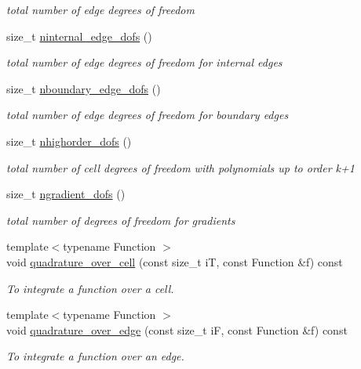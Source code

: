 \begin{DoxyCompactItemize}
\begin{DoxyCompactList}\small\item\em total number of edge degrees of freedom \end{DoxyCompactList}\item 
size\+\_\+t \hyperlink{group__HybridCore_gae6e771ab58f248db8f051d47de982cf5}{ninternal\+\_\+edge\+\_\+dofs} ()
\begin{DoxyCompactList}\small\item\em total number of edge degrees of freedom for internal edges \end{DoxyCompactList}\item 
size\+\_\+t \hyperlink{group__HybridCore_ga5fd63afc45211d3005f6e25682c533b2}{nboundary\+\_\+edge\+\_\+dofs} ()
\begin{DoxyCompactList}\small\item\em total number of edge degrees of freedom for boundary edges \end{DoxyCompactList}\item 
size\+\_\+t \hyperlink{group__HybridCore_gaa7f78bc066429a18ad596d45a79d37bc}{nhighorder\+\_\+dofs} ()
\begin{DoxyCompactList}\small\item\em total number of cell degrees of freedom with polynomials up to order k+1 \end{DoxyCompactList}\item 
size\+\_\+t \hyperlink{group__HybridCore_ga6f7c5ef5103bed8a3e0ecc18d592b1f9}{ngradient\+\_\+dofs} ()
\begin{DoxyCompactList}\small\item\em total number of degrees of freedom for gradients \end{DoxyCompactList}\item 
{\footnotesize template$<$typename Function $>$ }\\void \hyperlink{group__HybridCore_ga3c33c8cec55dbe2d8873e53fcd43d01f}{quadrature\+\_\+over\+\_\+cell} (const size\+\_\+t iT, const Function \&f) const
\begin{DoxyCompactList}\small\item\em To integrate a function over a cell. \end{DoxyCompactList}\item 
{\footnotesize template$<$typename Function $>$ }\\void \hyperlink{group__HybridCore_gafbf9c61f2d929331197ba971b52b8710}{quadrature\+\_\+over\+\_\+edge} (const size\+\_\+t iF, const Function \&f) const
\begin{DoxyCompactList}\small\item\em To integrate a function over an edge. \end{DoxyCompactList}\item 

\end{DoxyCompactItemize}
